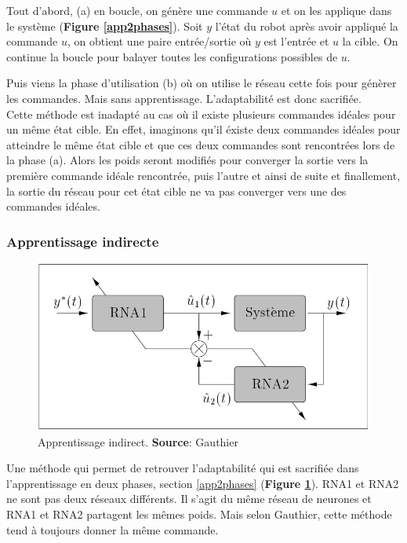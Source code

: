 Tout d'abord, (a) en boucle, on génère une commande $u$ et on les applique dans le système (\textbf{Figure \ref{app2phases}}).
Soit $y$ l'état du robot après avoir appliqué la commande $u$, on obtient une paire entrée/sortie où $y$ est l'entrée et $u$ la cible.
On continue la boucle pour balayer toutes les configurations possibles de $u$.

Puis viens la phase d'utilisation (b) où on utilise le réseau cette fois pour génèrer les commandes. Mais sans apprentissage. L'adaptabilité est donc sacrifiée.\\

Cette méthode est inadapté au cas où il existe plusieurs commandes idéales pour un même état cible.
En effet, imaginons qu'il éxiste deux commandes idéales pour atteindre le même état cible et que ces deux commandes sont rencontrées lors de la phase (a).
Alors les poids seront modifiés pour converger la sortie vers la première commande idéale rencontrée, puis l'autre et ainsi de suite et finallement, la sortie du réseau pour cet état cible ne va pas converger vers une des commandes idéales.

\subsubsection{Apprentissage indirecte}
\begin{figure}
 \centering
 \includegraphics[scale=0.5]{../figures/appindirect.jpg}
 \caption{Apprentissage indirect. \textbf{Source}: Gauthier\cite{Gauthier}}
 \label{appindirect}
\end{figure}

Une méthode qui permet de retrouver l'adaptabilité qui est sacrifiée dans l'apprentissage en deux phases, section \ref{app2phases} (\textbf{Figure \ref{appindirect}}).
RNA1 et RNA2 ne sont pas deux réseaux différents. Il s'agit du même réseau de neurones et RNA1 et RNA2 partagent les mêmes poids.
Mais selon Gauthier\cite{Gauthier}, cette méthode tend à toujours donner la même commande.

